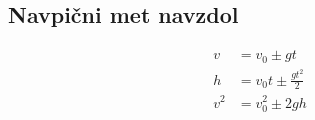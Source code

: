 {\color{indiagreen}\subsection{Navpični met navzdol}}
\begin{align*}
	v &= v_0 \pm gt\\
	h &= v_0 t \pm \frac{gt^2}{2}\\
	v^2 &= v_0^2 \pm 2gh\\
\end{align*}